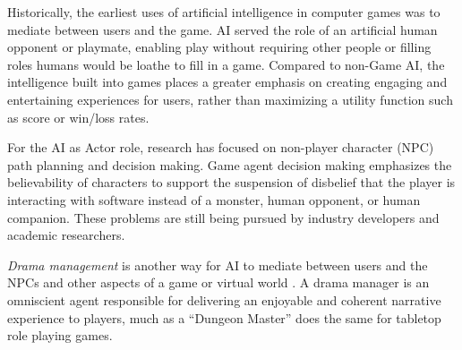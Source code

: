 \documentclass[conference]{IEEEtran}
\newcommand{\mytodo}[1]{\textbf{[[#1]]}}
\begin{document}
%
%
Historically, the earliest uses of artificial intelligence in computer games was to mediate between users and the game.
AI served the role of an artificial human opponent or playmate, enabling play without requiring other people or filling roles humans would be loathe to fill in a game.
%
Compared to non-Game AI, the intelligence built into games places a greater emphasis on creating engaging and entertaining experiences for users, 
rather than maximizing a utility function such as score or win/loss rates. 

For the AI as Actor role, research has focused on non-player character (NPC) path planning and decision making.
Game agent decision making emphasizes the believability of characters to support the suspension of disbelief that the player is interacting with software instead of a monster, human opponent, or human companion.
These problems are still being pursued by industry developers and academic researchers.

{\em Drama management} is another way for AI to mediate between users and the NPCs and other aspects of a game or virtual world \cite{mateas1999:oz-review-dm, roberts2008:dm-review, riedl2013:in-aimag}. 
A drama manager is an omniscient agent responsible for delivering an enjoyable and coherent narrative experience to players, much as a ``Dungeon Master'' does the same for tabletop role playing games.
\end{document}
